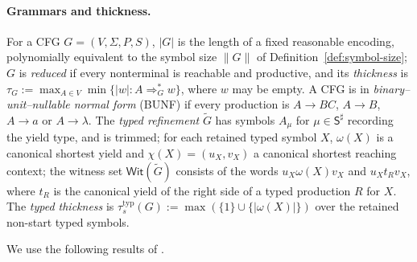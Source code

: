 \documentclass[11pt]{article}
\numberwithin{equation}{section}
\theoremstyle{plain}
\theoremstyle{definition}
\theoremstyle{remark}
\theoremstyle{plain}
\newcommand{\WitnessSet}{\mathsf{Wit}}
\begin{document}
\paragraph{Grammars and thickness.}
For a CFG $G=(V,\Sigma,P,S)$, $|G|$ is the length of a fixed reasonable encoding,
polynomially equivalent to the symbol size $\|G\|$ of
Definition~\ref{def:symbol-size}; $G$ is \emph{reduced} if every nonterminal
is reachable and productive, and its \emph{thickness} is
$\tau_G:=\max_{A\in V}\min\{|w|:A\Rightarrow_G^*w\}$, where $w$ may be empty.
A CFG is in \emph{binary--unit--nullable normal form} (BUNF) if every production
is $A\to BC$, $A\to B$, $A\to a$ or $A\to\lambda$.  The
\emph{typed refinement} $\widetilde G$ has symbols $A_\mu$ for
$\mu\in\mathsf S^\sharp$ recording the yield type, and is trimmed; for each
retained typed symbol $X$, $\omega(X)$ is a canonical shortest yield and
$\chi(X)=(u_X,v_X)$ a canonical shortest reaching context; the witness set
$\WitnessSet(\widetilde G)$ consists of the words $u_X\omega(X)v_X$ and
$u_Xt_Rv_X$, where $t_R$ is the canonical yield of the right side of a typed
production $R$ for $X$.  The \emph{typed thickness}
is $\tau^{\mathrm{typ}}_s(G):=\max(\{1\}\cup\{|\omega(X)|\})$ over the retained
non-start typed symbols.

We use the following results of \cite{kuriyamaCFG}.
\end{document}
